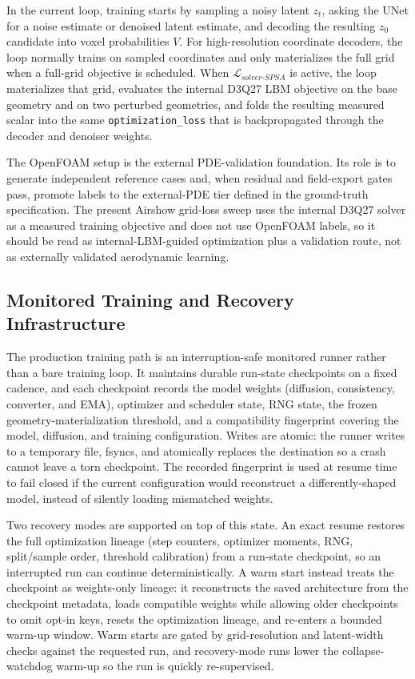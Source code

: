 In the current loop, training starts by sampling a noisy latent \(z_t\), asking the UNet for a noise estimate or denoised latent estimate, and decoding the resulting \(z_0\) candidate into voxel probabilities \(V\). For high-resolution coordinate decoders, the loop normally trains on sampled coordinates and only materializes the full grid when a full-grid objective is scheduled. When \(\mathcal{L}_{solver\mbox{-}SPSA}\) is active, the loop materializes that grid, evaluates the internal D3Q27 LBM objective on the base geometry and on two perturbed geometries, and folds the resulting measured scalar into the same \texttt{optimization\_loss} that is backpropagated through the decoder and denoiser weights.

The OpenFOAM setup is the external PDE-validation foundation. Its role is to generate independent reference cases and, when residual and field-export gates pass, promote labels to the external-PDE tier defined in the ground-truth specification. The present Airshow grid-loss sweep uses the internal D3Q27 solver as a measured training objective and does not use OpenFOAM labels, so it should be read as internal-LBM-guided optimization plus a validation route, not as externally validated aerodynamic learning.

\subsection{Monitored Training and Recovery Infrastructure}
The production training path is an interruption-safe monitored runner rather than a bare training loop. It maintains durable run-state checkpoints on a fixed cadence, and each checkpoint records the model weights (diffusion, consistency, converter, and EMA), optimizer and scheduler state, RNG state, the frozen geometry-materialization threshold, and a compatibility fingerprint covering the model, diffusion, and training configuration. Writes are atomic: the runner writes to a temporary file, fsyncs, and atomically replaces the destination so a crash cannot leave a torn checkpoint. The recorded fingerprint is used at resume time to fail closed if the current configuration would reconstruct a differently-shaped model, instead of silently loading mismatched weights.

Two recovery modes are supported on top of this state. An exact resume restores the full optimization lineage (step counters, optimizer moments, RNG, split/sample order, threshold calibration) from a run-state checkpoint, so an interrupted run can continue deterministically. A warm start instead treats the checkpoint as weights-only lineage: it reconstructs the saved architecture from the checkpoint metadata, loads compatible weights while allowing older checkpoints to omit opt-in keys, resets the optimization lineage, and re-enters a bounded warm-up window. Warm starts are gated by grid-resolution and latent-width checks against the requested run, and recovery-mode runs lower the collapse-watchdog warm-up so the run is quickly re-supervised.

